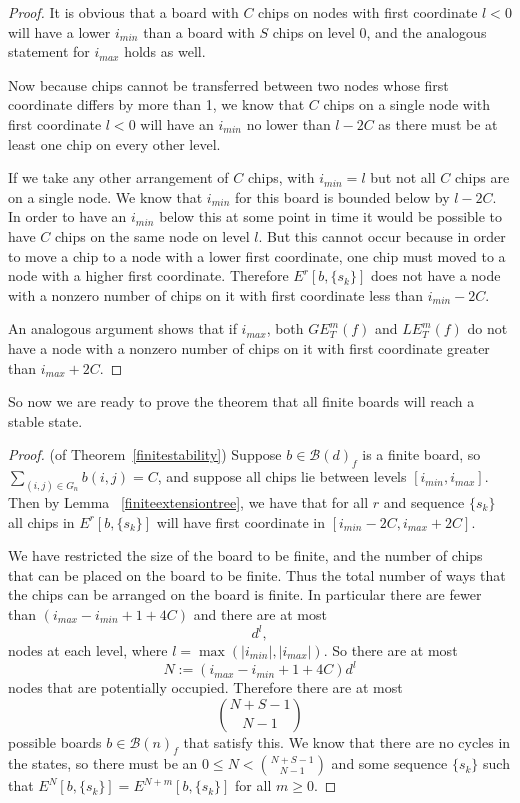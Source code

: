 \documentclass[runningheads,a4paper]{llncs}
\begin{document}
\begin{proof}
It is obvious that a board with $C$ chips on nodes with first coordinate $l<0$ will have a lower $i_{min}$ than a board with $S$ chips on level 0, and the analogous statement for $i_{max}$ holds as well. 

Now because chips cannot be transferred between two nodes whose first coordinate differs by more than 1, we know that $C$ chips on a single node with first coordinate $l<0$ will have an $i_{min}$ no lower than $l-2C$ as there must be at least one chip on every other level. 

If we take any other arrangement of $C$ chips, with $i_{min}=l$ but not all $C$ chips are on a single node. We know that $i_{min}$ for this board is bounded below by $l-2C$. In order to have an $i_{min}$ below this at some point in time it would be possible to have $C$ chips on the same node on level $l$. But this cannot occur because in order to move a chip to a node with a lower first coordinate, one chip must moved to a node with a higher first coordinate. Therefore $E^r[b, \{s_k\}]$ does not have a node with a nonzero number of chips on it with first coordinate less than $i_{min} -2C$.

An analogous argument shows that if $i_{max}$, both $GE_T^m(f)$ and $LE_T^m(f)$ do not have a node with a nonzero number of chips on it with first coordinate greater than $i_{max}+2C$.
\end{proof}

So now we are ready to prove the theorem that all finite boards will reach a stable state. 

\begin{proof}
(of Theorem~\ref{finitestability}) Suppose $b \in \mathcal{B}(d)_f$ is a finite board, so $\sum_{(i,j) \in G_n} b(i,j) = C$, and suppose all chips lie between levels  $[i_{min}, i_{max}]$. Then by Lemma ~\ref{finiteextensiontree}, we have that for all $r$ and sequence $\{s_k\}$ all chips in $E^r[b, \{s_k\}]$ will have first coordinate in $ [i_{min} -2C, i_{max} +2C]$.

We have restricted the size of the board to be finite, and the number of chips that can be placed on the board to be finite. 
Thus the total number of ways that the chips can be arranged on the board is finite. 
In particular there are fewer than $(i_{max} - i_{min}+1 + 4 C)$  and there are at most 
\begin{equation}
d^l,
\end{equation}
nodes at each level, where $l= \max(|i_{min}|, |i_{max}|)$. So there are at most 
\begin{equation}
N:=(i_{max} - i_{min}+1 + 4 C)d^l
\end{equation}
nodes that are potentially occupied. Therefore there are at most 
\begin{equation}
\binom{N+S-1}{N-1}
\end{equation}
possible boards $b \in \mathcal{B}(n)_f$ that satisfy this. We know that there are no cycles in the states, so there must be an $0 \leq N < \binom{N+S-1}{N-1}$ and some sequence $\{s_k\}$ such that $E^N[b, \{s_k\}] = E^{N+m}[b, \{s_k\}]$ for all $m \geq 0$.
\end{proof}
\end{document}
